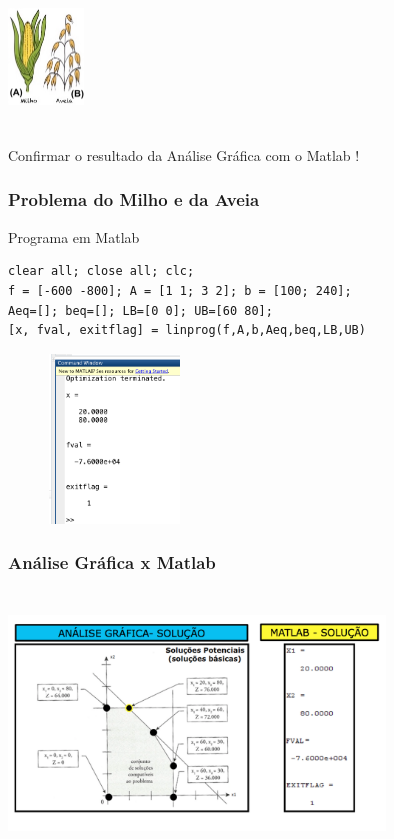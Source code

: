 \documentclass{beamer}
\begin{document}
\begin{frame}
\begin{columns}
\begin{column}{0.3\textwidth}
			\centering
			\includegraphics[width=2cm,height=3cm]{milho_aveia2.png}
		\end{column}
	\end{columns}
	\begin{mdframed}[backgroundcolor=blue!20]
		\Large
		Confirmar o resultado da Análise Gráfica com o Matlab !
	\end{mdframed}	
\end{frame}

\begin{frame}[fragile] 
	\frametitle{Problema do Milho e da Aveia}
	\centering
	\begin{block}{Programa em Matlab}
		\begin{lstlisting}
clear all; close all; clc;
f = [-600 -800]; A = [1 1; 3 2]; b = [100; 240];
Aeq=[]; beq=[]; LB=[0 0]; UB=[60 80];
[x, fval, exitflag] = linprog(f,A,b,Aeq,beq,LB,UB)		
		\end{lstlisting}	
	\end{block}	

	\begin{figure}
		\includegraphics[width=3.5cm,height=4.5cm]{MatLabTriboAveia.png}
	\end{figure}

\end{frame}

\begin{frame}
	\frametitle{Análise Gráfica x Matlab}
	\centering
	\includegraphics[width=10cm,height=7cm]{graficamatlab.png}
\end{frame}
\end{document}
